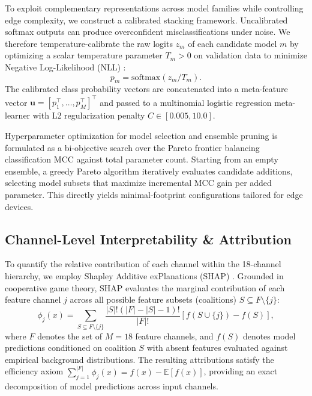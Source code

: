 To exploit complementary representations across model families while controlling edge complexity, we construct a calibrated stacking framework. Uncalibrated softmax outputs can produce overconfident misclassifications under noise. We therefore temperature-calibrate the raw logits $z_m$ of each candidate model $m$ by optimizing a scalar temperature parameter $T_m > 0$ on validation data to minimize Negative Log-Likelihood (\ac{NLL}) \cite{guo2017calibration}:
\begin{equation}
    p_m = \text{softmax}(z_m / T_m).
\end{equation}
The calibrated class probability vectors are concatenated into a meta-feature vector $\mathbf{u} = [p_1^\top, \dots, p_M^\top]^\top$ and passed to a multinomial logistic regression meta-learner \cite{wolpert1992stacked} with L2 regularization penalty $C \in [0.005, 10.0]$.

Hyperparameter optimization for model selection and ensemble pruning is formulated as a bi-objective search over the Pareto frontier balancing classification \ac{MCC} against total parameter count. Starting from an empty ensemble, a greedy Pareto algorithm iteratively evaluates candidate additions, selecting model subsets that maximize incremental \ac{MCC} gain per added parameter. This directly yields minimal-footprint configurations tailored for edge devices.

\subsection{Channel-Level Interpretability \& Attribution}

To quantify the relative contribution of each channel within the 18-channel hierarchy, we employ Shapley Additive exPlanations (\ac{SHAP}) \cite{lundberg2017shap}. Grounded in cooperative game theory, \ac{SHAP} evaluates the marginal contribution of each feature channel $j$ across all possible feature subsets (coalitions) $S \subseteq F \setminus \{j\}$:
\begin{equation}
    \phi_j(x) = \sum_{S \subseteq F \setminus \{j\}} \frac{|S|!(|F| - |S| - 1)!}{|F|!} \left[ f(S \cup \{j\}) - f(S) \right],
\end{equation}
where $F$ denotes the set of $M=18$ feature channels, and $f(S)$ denotes model predictions conditioned on coalition $S$ with absent features evaluated against empirical background distributions. The resulting attributions satisfy the efficiency axiom $\sum_{j=1}^{|F|} \phi_j(x) = f(x) - \mathbb{E}[f(x)]$, providing an exact decomposition of model predictions across input channels.
